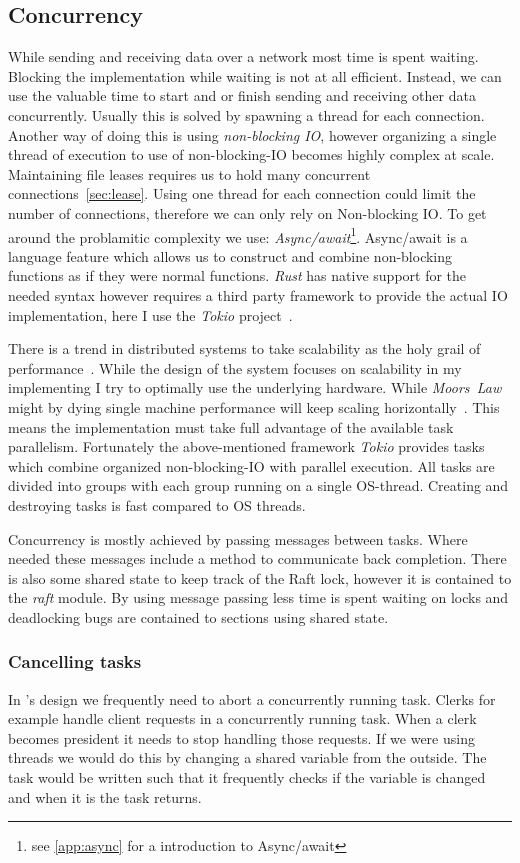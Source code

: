 \subsection{Concurrency}
While sending and receiving data over a network most time is spent waiting. Blocking the implementation while waiting is not at all efficient. Instead, we can use the valuable time to start and or finish sending and receiving other data concurrently. Usually this is solved by spawning a thread for each connection. Another way of doing this is using \textit{non-blocking IO}, however organizing a single thread of execution to use of non-blocking-IO becomes highly complex at scale. 
Maintaining file leases requires us to hold many concurrent connections~\cref{sec:lease}. Using one thread for each connection could limit the number of connections, therefore we can only rely on Non-blocking IO. To get around the problamitic complexity we use: \textit{Async/await}\footnote{see \cref{app:async} for a introduction to Async/await}. Async/await is a language feature which allows us to construct and combine non-blocking functions as if they were normal functions. \textit{Rust} has native support for the needed syntax however requires a third party framework to provide the actual IO implementation, here I use the \textit{Tokio} project~\cite{tokio}.

There is a trend in distributed systems to take scalability as the holy grail of performance~\cite{scaling}. While the design of the system focuses on scalability in my implementing I try to optimally use the underlying hardware. While \textit{Moors~Law} might by dying single machine performance will keep scaling horizontally~\cite{moore}. This means the implementation must take full advantage of the available task parallelism. Fortunately the above-mentioned framework \textit{Tokio} provides tasks which combine organized non-blocking-IO with parallel execution. All tasks are divided into groups with each group running on a single OS-thread. Creating and destroying tasks is fast compared to OS threads.

Concurrency is mostly achieved by passing messages between tasks. Where needed these messages include a method to communicate back completion. There is also some shared state to keep track of the Raft lock, however it is contained to the \textsl{raft} module. By using message passing less time is spent waiting on locks and deadlocking bugs are contained to sections using shared state. 

\subsubsection*{Cancelling tasks}
In \name's design we frequently need to abort a concurrently running task. Clerks for example handle client requests in a concurrently running task. When a clerk becomes president it needs to stop handling those requests. If we were using threads we would do this by changing a shared variable from the outside. The task would be written such that it frequently checks if the variable is changed and when it is the task returns. 

